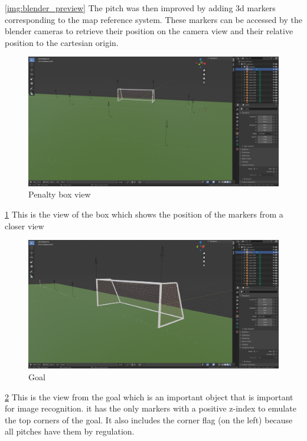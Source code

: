 \documentclass[
11pt,
twoside
]{report}
\begin{document}
\ref{img:blender_preview} The pitch was then improved by adding 3d markers corresponding to the map reference system. These markers can be accessed by the blender cameras to retrieve their position on the camera view and their relative position to the cartesian origin.
\begin{figure}[H]
    \includegraphics[keepaspectratio, width=\columnwidth]{Screenshot_2022-03-05_12-45-59.png}
    \caption{Penalty box view}
    \label{img:penalty_box}
\end{figure}
\ref{img:penalty_box} This is the view of the box which shows the position of the markers from a closer view
\begin{figure}[H]
    \includegraphics[keepaspectratio, width=\columnwidth]{Screenshot_2022-03-05_12-47-42.png}
    \caption{Goal}
    \label{img:goal}
\end{figure}
\ref{img:goal} This is the view from the goal which is an important object that is important for image recognition. it has the only markers with a positive z-index to emulate the top corners of the goal. It also includes the corner flag (on the left) because all pitches have them by regulation.
\end{document}

